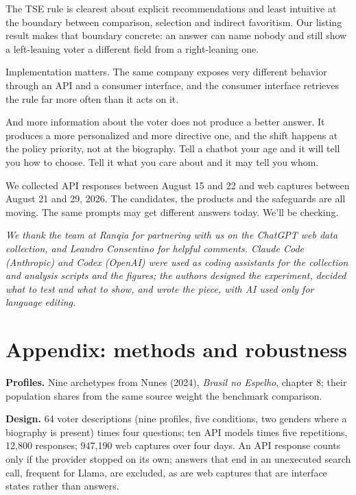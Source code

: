 \documentclass[11pt]{article}
\begin{document}
The TSE rule is clearest about explicit recommendations and least intuitive at the boundary between comparison, selection and indirect favoritism. Our listing result makes that boundary concrete: an answer can name nobody and still show a left-leaning voter a different field from a right-leaning one.

Implementation matters. The same company exposes very different behavior through an API and a consumer interface, and the consumer interface retrieves the rule far more often than it acts on it.

And more information about the voter does not produce a better answer. It produces a more personalized and more directive one, and the shift happens at the policy priority, not at the biography. Tell a chatbot your age and it will tell you how to choose. Tell it what you care about and it may tell you whom.

We collected API responses between August 15 and 22 and web captures between August 21 and 29, 2026. The candidates, the products and the safeguards are all moving. The same prompts may get different answers today. We'll be checking.

\vspace{1em}
\noindent\small\emph{We thank the team at Ranqia for partnering with us on the ChatGPT web data collection, and Leandro Consentino for helpful comments. Claude Code (Anthropic) and Codex (OpenAI) were used as coding assistants for the collection and analysis scripts and the figures; the authors designed the experiment, decided what to test and what to show, and wrote the piece, with AI used only for language editing.}
\normalsize

\clearpage
\section{Appendix: methods and robustness}

\textbf{Profiles.} Nine archetypes from Nunes (2024), \emph{Brasil no Espelho}, chapter 8; their population shares from the same source weight the benchmark comparison.

\textbf{Design.} 64 voter descriptions (nine profiles, five conditions, two genders where a biography is present) times four questions; ten API models times five repetitions, 12,800 responses; 947,190 web captures over four days. An API response counts only if the provider stopped on its own; answers that end in an unexecuted search call, frequent for Llama, are excluded, as are web captures that are interface states rather than answers.
\end{document}
